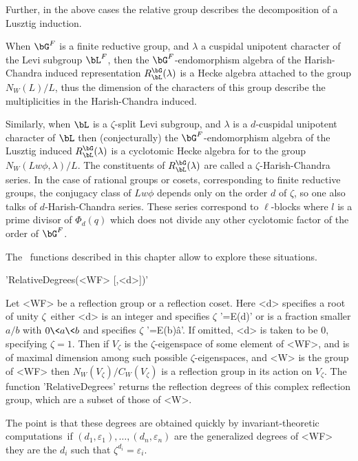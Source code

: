 Further, in the above cases the relative group describes the decomposition
of a Lusztig induction.

When  $\bG^F$  is  a  finite  reductive  group,  and  $\lambda$  a cuspidal
unipotent character of the Levi subgroup $\bL^F$, then the
$\bG^F$-endomorphism  algebra of the  Harish-Chandra induced representation
$R_\bL^\bG(\lambda)$  is a Hecke algebra  attached to the group $N_W(L)/L$,
thus   the  dimension  of  the  characters   of  this  group  describe  the
multiplicities in the Harish-Chandra induced.

Similarly,  when $\bL$ is a $\zeta$-split Levi subgroup, and $\lambda$ is a
$d$-cuspidal   unipotent  character  of   $\bL$  then  (conjecturally)  the
$\bG^F$-endomorphism algebra of the Lusztig induced $R_\bL^\bG(\lambda)$ is
a  cyclotomic Hecke algebra  for to the  group $N_W(Lw\phi,\lambda)/L$. The
constituents  of $R_\bL^\bG(\lambda)$  are called  a $\zeta$-Harish-Chandra
series.  In the case of rational  groups or cosets, corresponding to finite
reductive groups, the conjugacy class of $Lw\phi$ depends only on the order
$d$  of  $\zeta$,  so  one  also  talks of $d$-Harish-Chandra series. These
series  correspond  to  $\ell$-blocks  where  $l$  is  a  prime  divisor of
$\Phi_d(q)$  which does not divide any other cyclotomic factor of the order
of $\bG^F$.

The  \CHEVIE\ functions  described in  this chapter  allow to explore these
situations.

'RelativeDegrees(<WF> [,<d>])'

Let  <WF> be a reflection group or a reflection coset. Here <d> specifies a
root  of unity  $\zeta$\:\ either  <d> is  an integer and specifies $\zeta$
'=E(d)' or is a fraction smaller $a/b$ with $0\<a\<b$ and specifies $\zeta$
'=E(b)\^a'.  If omitted, <d> is taken to be $0$, specifying $\zeta=1$. Then
if  $V_\zeta$ is the $\zeta$-eigenspace of some  element of <WF>, and is of
maximal  dimension among such possible  $\zeta$-eigenspaces, and <W> is the
group of <WF> then $N_W(V_\zeta)/C_W(V_\zeta)$ is a reflection group in its
action  on $V_\zeta$. The function 'RelativeDegrees' returns the reflection
degrees  of this complex reflection  group, which are a  subset of those of
<W>.

The point is that these degrees are obtained quickly by invariant-theoretic
computations\:\ if $(d_1,\varepsilon_1),\ldots,(d_n,\varepsilon_n)$ are the
generalized degrees of <WF> they are the $d_i$ such that
$\zeta^{d_i}=\varepsilon_i$.

